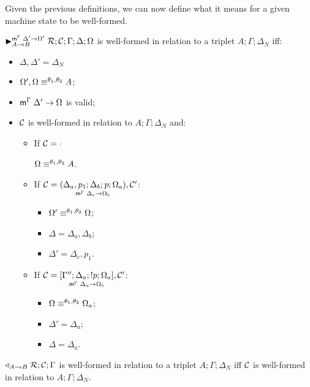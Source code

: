 Given the previous definitions, we can now define what it means for a given
machine state to be well-formed.

\begin{definition}

$\matstate{A \lolli B}{\rulestk}{\lstack{C}}{\Gamma}{\Delta}{\Omega}{\Delta'
\rightarrow \Omega'}$ is well-formed in relation to a triplet $A; \Gamma;
\Delta_{N}$ iff:

\begin{itemize}[leftmargin=*]
   \item $\Delta, \Delta' = \Delta_{N}$
   \item $\feq{\Omega', \Omega}{A}$;
   \item $\mz{\Gamma}{\Delta'}{\Omega}$ is valid;
   \item $\lstack{C}$ is well-formed in relation to $A; \Gamma; \Delta_{N}$ and:
   \begin{itemize}[leftmargin=\secondm]
      \item If $\lstack{C} = \cdot$
   
      $\feq{\Omega}{A}$.
   
      \item If $\lstack{C} = \lframe{\Delta_a,
   p_1}{\Delta_b}{p}{\Omega_a}{\Delta_c}{\Omega_b}, \lstack{C'}$:
      \begin{itemize}[leftmargin=\thirdm]
         \item $\feq{\Omega'}{\Omega}$;
         \item $\Delta = \Delta_a, \Delta_b$;
         \item $\Delta' = \Delta_c, p_1$.
      \end{itemize}

      \item If $\lstack{C} = \pframe{\Gamma''}{\Delta_a}{\bang
         p}{\Omega_a}{\Delta_a}{\Omega_b}, \lstack{C'}$:
      \begin{itemize}[leftmargin=\thirdm]
         \item $\feq{\Omega}{\Omega_a}$;
         \item $\Delta' = \Delta_a$;
         \item $\Delta = \Delta_a$.
      \end{itemize}
   \end{itemize}
\end{itemize}

\end{definition}

\begin{definition}
$\contstate{A \lolli B}{\rulestk}{\lstack{C}}{\Gamma}$ is well-formed in
relation to a triplet $A; \Gamma; \Delta_{N}$ iff $\lstack{C}$ is well-formed in
relation to $A; \Gamma; \Delta_{N}$.
\end{definition}

